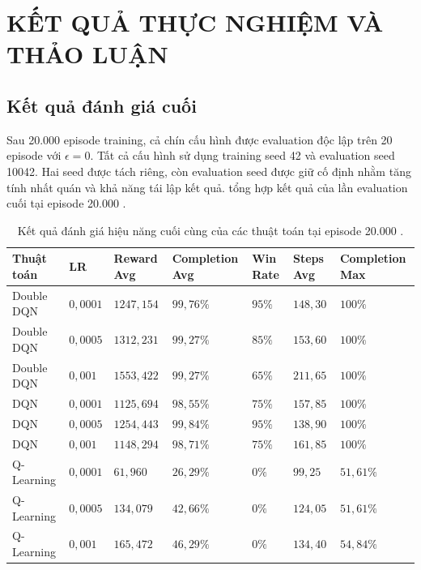 \section{KẾT QUẢ THỰC NGHIỆM VÀ THẢO LUẬN}

\subsection{Kết quả đánh giá cuối}

Sau 20.000 episode training, cả chín cấu hình được evaluation độc lập trên 20 episode với $\epsilon=0$. Tất cả cấu hình sử dụng training seed 42 và evaluation seed 10042. Hai seed được tách riêng, còn evaluation seed được giữ cố định nhằm tăng tính nhất quán và khả năng tái lập kết quả.  tổng hợp kết quả của lần evaluation cuối tại episode 20.000 \cite{DRLPacmanGitHub}.

\begin{table}[H]
    \centering
    \renewcommand{\arraystretch}{1.2}
    \small
    \begin{tabularx}{\textwidth}{@{}
        >{\raggedright\arraybackslash}p{2.4cm}
        >{\centering\arraybackslash}p{1.1cm}
        >{\centering\arraybackslash}p{1.9cm}
        >{\centering\arraybackslash}p{2.6cm}
        >{\centering\arraybackslash}p{1.4cm}
        >{\centering\arraybackslash}p{1.5cm}
        >{\centering\arraybackslash}X
    @{}}
        \toprule
        \textbf{Thuật toán} & \textbf{LR} & \textbf{Reward Avg} & \textbf{Completion Avg} & \textbf{Win Rate} & \textbf{Steps Avg} & \textbf{Completion Max} \\
        \midrule
        Double DQN & $0{,}0001$ & $1247{,}154$ & $99{,}76\%$ & $95\%$ & $148{,}30$ & $100\%$ \\
        Double DQN & $0{,}0005$ & $1312{,}231$ & $99{,}27\%$ & $85\%$ & $153{,}60$ & $100\%$ \\
        Double DQN & $0{,}001$ & $1553{,}422$ & $99{,}27\%$ & $65\%$ & $211{,}65$ & $100\%$ \\
        DQN & $0{,}0001$ & $1125{,}694$ & $98{,}55\%$ & $75\%$ & $157{,}85$ & $100\%$ \\
        DQN & $0{,}0005$ & $1254{,}443$ & $99{,}84\%$ & $95\%$ & $138{,}90$ & $100\%$ \\
        DQN & $0{,}001$ & $1148{,}294$ & $98{,}71\%$ & $75\%$ & $161{,}85$ & $100\%$ \\
        Q-Learning & $0{,}0001$ & $61{,}960$ & $26{,}29\%$ & $0\%$ & $99{,}25$ & $51{,}61\%$ \\
        Q-Learning & $0{,}0005$ & $134{,}079$ & $42{,}66\%$ & $0\%$ & $124{,}05$ & $51{,}61\%$ \\
        Q-Learning & $0{,}001$ & $165{,}472$ & $46{,}29\%$ & $0\%$ & $134{,}40$ & $54{,}84\%$ \\
        \bottomrule
    \end{tabularx}
    \caption{Kết quả đánh giá hiệu năng cuối cùng của các thuật toán tại episode 20.000 \cite{DRLPacmanGitHub}.}
    \label{tab:final-eval-results}
\end{table}

